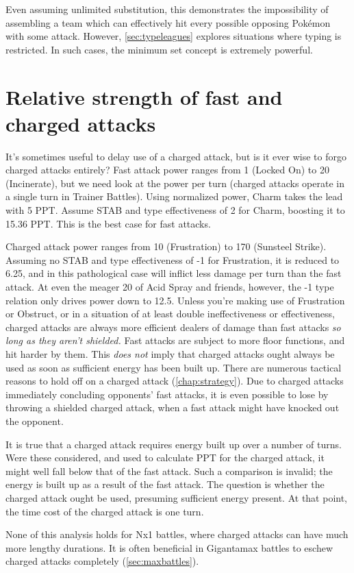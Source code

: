 Even assuming unlimited substitution, this demonstrates the
  impossibility of assembling a team which can effectively
  hit every possible opposing Pokémon with some attack.
However, \autoref{sec:typeleagues} explores situations where typing is restricted.
In such cases, the minimum set concept is extremely powerful.

\section{Relative strength of fast and charged attacks\label{sec:fastvchaged}}
It's sometimes useful to delay use of a charged attack, but is it ever wise to forgo
  charged attacks entirely?
Fast attack power ranges from 1 (Locked On) to 20 (Incinerate), but we need look at
  the power per turn (charged attacks operate in a single turn in Trainer Battles).
Using normalized power, Charm takes the lead with 5 PPT\@.
Assume STAB and type effectiveness of 2 for Charm, boosting it to 15.36 PPT\@.
This is the best case for fast attacks.

Charged attack power ranges from 10 (Frustration) to 170 (Sunsteel Strike).
Assuming no STAB and type effectiveness of -1 for Frustration, it is reduced to 6.25,
  and in this pathological case will inflict less damage per turn than the fast attack.
At even the meager 20 of Acid Spray and friends, however, the -1 type relation only
  drives power down to 12.5.
Unless you're making use of Frustration or Obstruct,
  or in a situation of at least double ineffectiveness or effectiveness,
  charged attacks are always more efficient dealers of damage than fast attacks \textit{so long
  as they aren't shielded.}
Fast attacks are subject to more floor functions, and hit harder by them.
This \textit{does not} imply that charged attacks ought always be used as soon as
  sufficient energy has been built up.
There are numerous tactical reasons to hold off on a charged attack (\autoref{chap:strategy}).
Due to charged attacks immediately concluding opponents' fast attacks,
 it is even possible to lose by throwing a shielded charged attack, when
 a fast attack might have knocked out the opponent.

It is true that a charged attack requires energy built up over a number of turns.
Were these considered, and used to calculate PPT for the charged attack,
  it might well fall below that of the fast attack.
Such a comparison is invalid; the energy is built up as a result of the fast attack.
The question is whether the charged attack ought be used, presuming sufficient energy present.
At that point, the time cost of the charged attack is one turn.

None of this analysis holds for Nx1 battles, where charged attacks can have much more lengthy durations.
It is often beneficial in Gigantamax battles to eschew charged attacks completely (\autoref{sec:maxbattles}).
